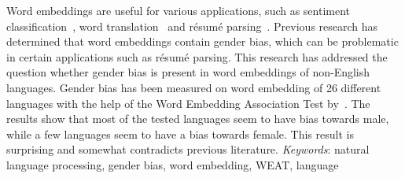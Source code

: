 
Word embeddings are useful for various applications, such as sentiment
classification~\parencite{tang2014learning}, word translation~\parencite{xing2015normalized} and résumé parsing~\parencite{nasser2018convolutional}. 
Previous research has determined that word embeddings contain gender
bias, which can be problematic in certain applications such as résumé parsing.
This research has addressed the question whether gender bias is present in word
embeddings of non-English languages.
Gender bias has been measured on word embedding of 26 different languages with the help
of the Word Embedding Association Test
by~\textcite{caliskan_2017_semantics_language_corpora}.
The results show that most of the tested languages seem to have bias towards male,
while a few languages seem to have a bias towards female.
This result is surprising and somewhat contradicts previous literature.
\newline
\newline
\emph{Keywords}: natural language processing, gender bias, word embedding, WEAT, language
